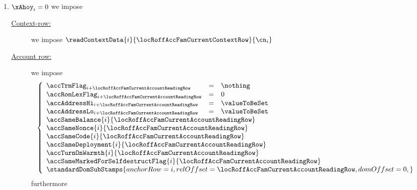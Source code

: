 \begin{description}
\begin{enumerate}
				\begin{enumerate}
					\item \If $\xAhoy_{i} = 0$ \Then we impose
						\begin{description}
							\item[\underline{Context-row:}]
								we impose
								$\readContextData {i}{\locRoffAccFamCurrentContextRow}{\cn_{i}}$
							\item[\underline{Account row:}]
								we impose
								\[
									\left\{ \begin{array}{lcl}
										\accTrmFlag      _{i + \locRoffAccFamCurrentAccountReadingRow} & = & \nothing      \\
										\accRomLexFlag   _{i + \locRoffAccFamCurrentAccountReadingRow} & = & 0             \\
										\accAddressHi    _{i + \locRoffAccFamCurrentAccountReadingRow} & = & \valueToBeSet \\
										\accAddressLo    _{i + \locRoffAccFamCurrentAccountReadingRow} & = & \valueToBeSet \\
										\multicolumn{3}{l}{\accSameBalance                     {i}{\locRoffAccFamCurrentAccountReadingRow}} \\
										\multicolumn{3}{l}{\accSameNonce                       {i}{\locRoffAccFamCurrentAccountReadingRow}} \\
										\multicolumn{3}{l}{\accSameCode                        {i}{\locRoffAccFamCurrentAccountReadingRow}} \\
										\multicolumn{3}{l}{\accSameDeployment                  {i}{\locRoffAccFamCurrentAccountReadingRow}} \\
										\multicolumn{3}{l}{\accTurnOnWarmth                    {i}{\locRoffAccFamCurrentAccountReadingRow}} \\
										\multicolumn{3}{l}{\accSameMarkedForSelfdestructFlag   {i}{\locRoffAccFamCurrentAccountReadingRow}} \\
										\multicolumn{3}{l}{
											\standardDomSubStamps {
												anchorRow        = i                                      ,
												relOffset        = \locRoffAccFamCurrentAccountReadingRow ,
												domOffset        = 0                                      ,
											}
										} \\
									\end{array} \right.
								\]
								furthermore
								\begin{enumerate}

\end{enumerate}
\end{description}
\end{enumerate}
\end{enumerate}
\end{description}
